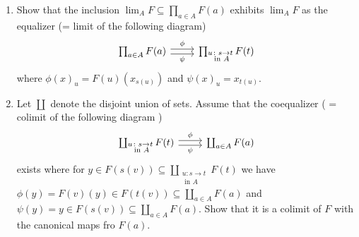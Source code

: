 \begin{enumerate}[label=(\alph*)]
    \item 
    Show that the inclusion $ \lim_A F \subseteq \prod_{ a \in A } F ( a ) $ exhibits $ \lim_A F $ as the equalizer (= limit of the following diagram)
    \[
    \begin{tikzcd}
        \prod_{ a \in A } F ( a ) 
        \ar[r , shift left, " \phi "]
        \ar[r , shift right, " \psi "']
        &
        \prod_{ \substack{ u \colon s \to t \\ \text{ in } A} } F ( t )
    \end{tikzcd}
    \]
    where $ \phi ( x )_u = F ( u ) ( x_{ s ( u ) } ) $ and $ \psi ( x )_u = x_{ t ( u ) }$.

    \item 
    Let $ \coprod $ denote the disjoint union of sets. 
    Assume that the coequalizer ( = colimit of the following diagram ) 
    \[
    \begin{tikzcd}
        \coprod_{ \substack{ u \colon s \to t \\ \text{ in } A} } F ( t )
        \ar[r , shift left, " \phi "]
        \ar[r , shift right, " \psi "']
        &
        \coprod_{ a \in A } F ( a ) 
    \end{tikzcd}    
    \]
    exists where for $ y \in F ( s ( v ) ) \subseteq \coprod_{ \substack{ u \colon s \to t \\ \text{ in } A} } F ( t ) $ we have $ \phi ( y ) = F ( v ) ( y ) \in F ( t ( v ) ) \subseteq \coprod_{ a \in A } F ( a ) $ and $ \psi ( y ) = y \in F ( s ( v ) ) \subseteq \coprod_{ a \in A } F ( a ) $. Show that it is a colimit of $ F $ with the canonical maps fro $ F ( a ) $.
\end{enumerate}

